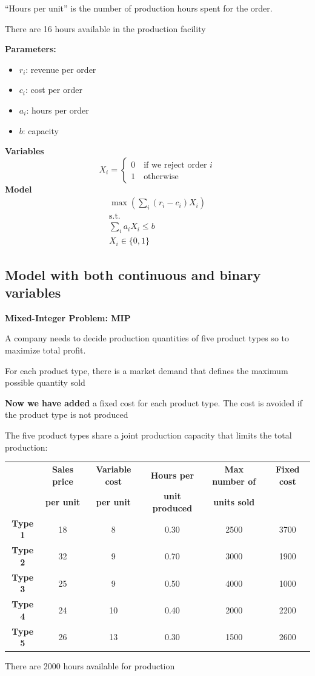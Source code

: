 \documentclass[10pt]{article}
\begin{document}
``Hours per unit'' is the number of production hours spent for the order. 

There are 16 hours available in the production facility

\textbf{Parameters:}
\begin{itemize}
    \item $r_i $: revenue per order 
    \item $c_i $: cost per order 
    \item $a_i $: hours per order 
    \item $b $: capacity
\end{itemize}

\textbf{Variables}
\[
X_i = 
\begin{cases}
    0 \quad\text{if we reject order }i\\
    1\quad\text{otherwise}
\end{cases}
\]
\textbf{Model}
\begin{gather*}
    \max\left(\sum_i (r_i - c_i)X_i\right)\\
    \text{s.t.}\\
    \sum_i a_iX_i \le b \\
    X_i \in \{0, 1\}
\end{gather*}
\newpage 
\subsection{Model with both continuous and binary variables}
\textbf{Mixed-Integer Problem: MIP}

A company needs to decide production quantities of five product types so to maximize total profit. 

For each product type, there is a market demand that defines the maximum possible quantity sold 

\textbf{Now we have added} a fixed cost for each product type. The cost is avoided if the product type is not produced

The five product types share a joint production capacity that limits the total production:

\begin{center}
    \begin{tabular}{|c|c|c|c|c|c|}
        \hline 
        & \textbf{Sales price } & \textbf{Variable cost } & \textbf{Hours per } & \textbf{Max number of } & \textbf{Fixed cost}\\
        & \textbf{per unit} & \textbf{per unit} & \textbf{unit produced} & \textbf{units sold} & \\\hline
        \textbf{Type 1} & 18 & 8 & 0.30 & 2500  & 3700 \\\hline
        \textbf{Type 2} & 32 & 9 & 0.70 & 3000  & 1900\\\hline
        \textbf{Type 3} & 25 & 9 & 0.50 & 4000  & 1000\\\hline
        \textbf{Type 4} & 24 & 10 & 0.40 & 2000 & 2200 \\\hline
        \textbf{Type 5} & 26 & 13 & 0.30 & 1500 & 2600 \\\hline
    \end{tabular}
\end{center}
There are 2000 hours available for production 
\end{document}
